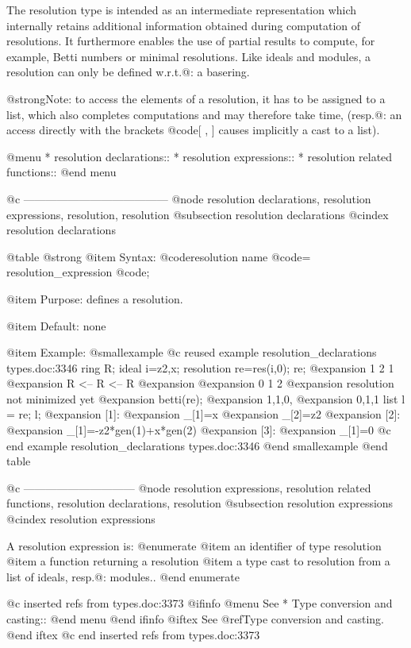 {{{{{{The resolution type is intended as an intermediate representation which
internally retains additional information obtained during computation of
resolutions. It furthermore enables the use of partial results to
compute, for example, Betti numbers or minimal resolutions. Like ideals
and modules, a resolution can only be defined w.r.t.@: a basering.

@strong{Note:}
to access the elements of a resolution, it has to be assigned to a list,
which also completes computations and may therefore take time,
(resp.@: an access directly with the brackets @code{[ , ]} causes
implicitly a cast to a list).

@menu
* resolution declarations::
* resolution expressions::
* resolution related functions::
@end menu

@c ---------------------------------------
@node resolution declarations, resolution expressions, resolution, resolution
@subsection resolution declarations
@cindex resolution declarations

@table @strong
@item Syntax:
@code{resolution} name @code{=} resolution_expression @code{;}

@item Purpose:
defines a resolution.

@item Default:
none

@item Example:
@smallexample
@c reused example resolution_declarations types.doc:3346 
  ring R;
  ideal i=z2,x;
  resolution re=res(i,0);
  re;
@expansion{}  1      2      1      
@expansion{} R <--  R <--  R
@expansion{} 
@expansion{} 0      1      2      
@expansion{} resolution not minimized yet
@expansion{} 
  betti(re);
@expansion{} 1,1,0,
@expansion{} 0,1,1 
  list l = re;
  l;
@expansion{} [1]:
@expansion{}    _[1]=x
@expansion{}    _[2]=z2
@expansion{} [2]:
@expansion{}    _[1]=-z2*gen(1)+x*gen(2)
@expansion{} [3]:
@expansion{}    _[1]=0
@c end example resolution_declarations types.doc:3346
@end smallexample
@end table

@c ------------------------------
@node resolution expressions, resolution related functions, resolution declarations, resolution
@subsection resolution expressions
@cindex resolution expressions

A resolution expression is:
@enumerate
@item
an identifier of type resolution
@item
a function returning a resolution
@item
a type cast to resolution from a list of ideals, resp.@: modules..
@end enumerate

@c inserted refs from types.doc:3373
@ifinfo
@menu
See 
* Type conversion and casting::
@end menu
@end ifinfo
@iftex
See 
@ref{Type conversion and casting}.
@end iftex
@c end inserted refs from types.doc:3373

}}}}}}
